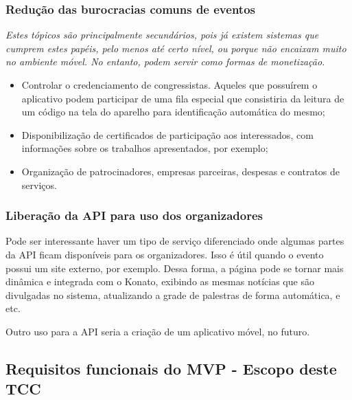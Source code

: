 \documentclass[12pt,a4paper,twoside,hyphens,english,brazil]{abntex2}
\begin{document}
\subsubsection*{Redução das burocracias comuns de eventos}
\emph{Estes tópicos são principalmente secundários, pois já existem sistemas que cumprem estes papéis, pelo menos até certo nível, ou porque não encaixam muito no ambiente móvel. No entanto, podem servir como formas de monetização.}
\begin{itemize}[itemsep=-0.5ex]
	\item Controlar o credenciamento de congressistas. Aqueles que possuírem o aplicativo podem participar de uma fila especial que consistiria da leitura de um código na tela do aparelho para identificação automática do mesmo;
	\item Disponibilização de certificados de participação aos interessados, com informações sobre os trabalhos apresentados, por exemplo;
	\item Organização de patrocinadores, empresas parceiras, despesas e contratos de serviços.
\end{itemize}

\subsubsection*{Liberação da API para uso dos organizadores}
Pode ser interessante haver um tipo de serviço diferenciado onde algumas partes da API ficam disponíveis para os organizadores. Isso é útil quando o evento possui um site externo, por exemplo. Dessa forma, a página pode se tornar mais dinâmica e integrada com o Konato, exibindo as mesmas notícias que são divulgadas no sistema, atualizando a grade de palestras de forma automática, e etc.

Outro uso para a API seria a criação de um aplicativo móvel, no futuro.

\subsection{Requisitos funcionais do MVP - Escopo deste TCC} \label{sec:requisitos:mvp}
\end{document}
